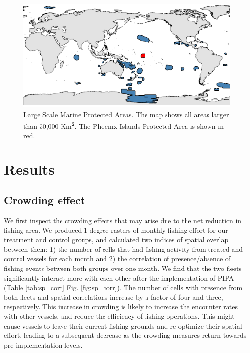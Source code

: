 \documentclass[9p,twocolumn,twoside,lineno]{pnas-new}
\begin{document}
\begin{figure}
\centering
\includegraphics{img/LSMPAs_map.pdf}
\caption{\label{fig:LSMPAs_map}Large Scale Marine Protected Areas. The map shows all areas larger than 30,000 Km\textsuperscript{2}. The Phoenix Islands Protected Area is shown in red.}
\end{figure}

\section{Results}\label{results}

\subsection{Crowding effect}

We first inspect the crowding effects that may arise due to the net reduction in fishing area. We produced 1-degree rasters of monthly fishing effort for our treatment and control groups, and calculated two indices of spatial overlap between them: 1) the number of cells that had fishing activity from treated and control vessels for each month and 2) the correlation of presence/absence of fishing events between both groups over one month. We find that the two fleets significantly interact more with each other after the implementation of PIPA (Table \ref{tab:sp_corr} Fig. \ref{fig:sp_corr}). The number of cells with presence from both fleets and spatial correlations increase by a factor of four and three, respectively. This increase in crowding is likely to increase the encounter rates with other vessels, and reduce the efficiency of fishing operations. This might cause vessels to leave their current fishing grounds and re-optimize their spatial effort, leading to a subsequent decrease as the crowding measures return towards pre-implementation levels.
\end{document}
